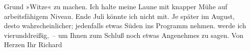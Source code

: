 \begin{ledgroupsized}[t]{13cm}
               Grund »Witze« zu machen. Ich halte meine Laune mit knapper Mühe auf arbeits{\pb}fähigem Niveau. Ende
                  Juli könnte ich nicht mit. Je später im August, desto wahrscheinlicher;
               jedenfalls etwas Süden ins Programm nehmen. \label{K_L01046_1v}\label{K_L01046_1h} werde ich vierunddreißig, –
               um Ihnen zum Schluß noch etwas Angenehmes zu sagen.\pend
           \pstart Von Herzen Ihr \spacefill\mbox{Richard}\pend{}\endnumbering{}\end{ledgroupsized}  \newcommand{\dateiname}{L01046}\newcommand{\titel}{Richard Beer-Hofmann an Arthur Schnitzler, 20. 6. 1900}\newcommand{\editorInnen}{Martin Anton Müller und Gerd-Hermann Susen}
      
